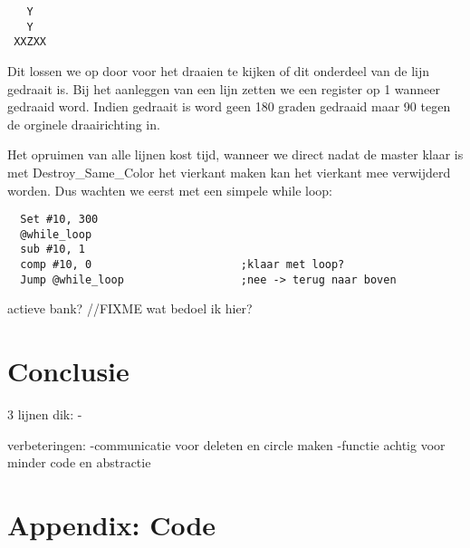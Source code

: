 \documentclass[10pt]{article}
\begin{document}
\begin{verbatim}
   Y
   Y
 XXZXX
\end{verbatim}

Dit lossen we op door voor het draaien te kijken of dit onderdeel van de lijn gedraait is. Bij het aanleggen van een lijn zetten we een register op 1 wanneer gedraaid word. Indien gedraait is word geen 180 graden gedraaid maar 90 tegen de orginele draairichting in.

Het opruimen van alle lijnen kost tijd, wanneer we direct nadat de master klaar is met Destroy\_Same\_Color het vierkant maken kan het vierkant mee verwijderd worden. Dus wachten we eerst met een simpele while loop: 

\begin{verbatim}
  Set #10, 300
  @while_loop
  sub #10, 1
  comp #10, 0                       ;klaar met loop?
  Jump @while_loop                  ;nee -> terug naar boven
\end{verbatim}

actieve bank? //FIXME wat bedoel ik hier?

\pagebreak

\section{Conclusie}

3 lijnen dik:
-

verbeteringen:
-communicatie voor deleten en circle maken
-functie achtig voor minder code en abstractie




\pagebreak
\section*{Appendix: Code}

\smallskip
\end{document}
